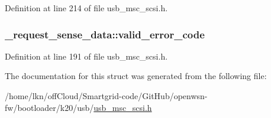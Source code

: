 Definition at line 214 of file usb\+\_\+msc\+\_\+scsi.\+h.

\subsubsection[{\texorpdfstring{valid\+\_\+error\+\_\+code}{valid_error_code}}]{ \+\_\+request\+\_\+sense\+\_\+data\+::valid\+\_\+error\+\_\+code}\hypertarget{struct__request__sense__data_a4ccc7647b488c56eaf6a467af93b0955}{}\label{struct__request__sense__data_a4ccc7647b488c56eaf6a467af93b0955}


Definition at line 191 of file usb\+\_\+msc\+\_\+scsi.\+h.



The documentation for this struct was generated from the following file\+:\begin{DoxyCompactItemize}
\item 
/home/lkn/off\+Cloud/\+Smartgrid-\/code/\+Git\+Hub/openwsn-\/fw/bootloader/k20/usb/\hyperlink{usb__msc__scsi_8h}{usb\+\_\+msc\+\_\+scsi.\+h}\end{DoxyCompactItemize}
